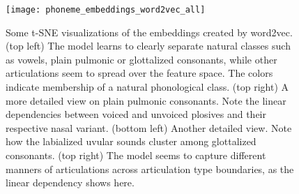 \documentclass[6pt]{article}
\begin{document}
%

%

\begin{figure}[h!] %
   \centering
   \texttt{[image: phoneme\_embeddings\_word2vec\_all]} 
   \caption{Some t-SNE visualizations of the embeddings created by word2vec. (top left) The model learns to clearly separate natural classes such as vowels, plain pulmonic or glottalized consonants, while other articulations seem to spread over the feature space. The colors indicate membership of a natural phonological class.  (top right) A more detailed view on plain pulmonic consonants. Note the linear dependencies between voiced and unvoiced plosives and their respective nasal variant. (bottom left) Another detailed view. Note how the labialized uvular sounds cluster among glottalized consonants. (top right) The model seems to capture different manners of articulations across articulation type boundaries, as the linear dependency shows here.}
   \label{fig:phoneme_embeddings_word2vec_all}
\end{figure}
\end{document}
